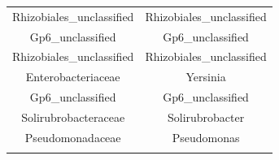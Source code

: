 \documentclass[]{article}
\begin{document}
\begin{longtable}[]{@{}cc@{}}
\begin{minipage}[t]{0.44\columnwidth}\centering\strut
Rhizobiales\_unclassified\strut
\end{minipage} & \begin{minipage}[t]{0.44\columnwidth}\centering\strut
Rhizobiales\_unclassified\strut
\end{minipage}\tabularnewline
\begin{minipage}[t]{0.44\columnwidth}\centering\strut
Gp6\_unclassified\strut
\end{minipage} & \begin{minipage}[t]{0.44\columnwidth}\centering\strut
Gp6\_unclassified\strut
\end{minipage}\tabularnewline
\begin{minipage}[t]{0.44\columnwidth}\centering\strut
Rhizobiales\_unclassified\strut
\end{minipage} & \begin{minipage}[t]{0.44\columnwidth}\centering\strut
Rhizobiales\_unclassified\strut
\end{minipage}\tabularnewline
\begin{minipage}[t]{0.44\columnwidth}\centering\strut
Enterobacteriaceae\strut
\end{minipage} & \begin{minipage}[t]{0.44\columnwidth}\centering\strut
Yersinia\strut
\end{minipage}\tabularnewline
\begin{minipage}[t]{0.44\columnwidth}\centering\strut
Gp6\_unclassified\strut
\end{minipage} & \begin{minipage}[t]{0.44\columnwidth}\centering\strut
Gp6\_unclassified\strut
\end{minipage}\tabularnewline
\begin{minipage}[t]{0.44\columnwidth}\centering\strut
Solirubrobacteraceae\strut
\end{minipage} & \begin{minipage}[t]{0.44\columnwidth}\centering\strut
Solirubrobacter\strut
\end{minipage}\tabularnewline
\begin{minipage}[t]{0.44\columnwidth}\centering\strut
Pseudomonadaceae\strut
\end{minipage} & \begin{minipage}[t]{0.44\columnwidth}\centering\strut
Pseudomonas\strut
\end{minipage}\tabularnewline
\begin{minipage}[t]{0.44\columnwidth}\centering\strut

\end{minipage}
\end{longtable}
\end{document}
